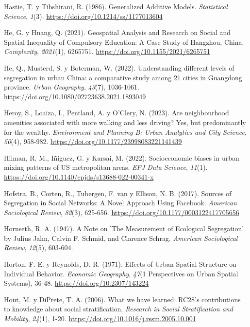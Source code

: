 \documentclass[
  spanish,
  a4paper,%
  chapterprefix=true,%
  DIV=calc,%
  twoside]{scrbook}%
\newlength{\cslhangindent}
\newenvironment{CSLReferences}[2] %
 {\begin{list}{}{%
  \setlength{\itemindent}{0pt}
  \setlength{\leftmargin}{0pt}
  \setlength{\parsep}{0pt}
  \ifodd #1
   \setlength{\leftmargin}{\cslhangindent}
   \setlength{\itemindent}{-1\cslhangindent}
  \fi
  \setlength{\itemsep}{#2\baselineskip}}}
 {\end{list}}
\begin{document}
\begin{CSLReferences}{1}{0}
Hastie, T. y Tibshirani, R. (1986). Generalized Additive Models. \emph{Statistical Science}, \emph{1}(3). \url{https://doi.org/10.1214/ss/1177013604}

He, G. y Huang, Q. (2021). Geospatial Analysis and Research on Social and Spatial Inequality of Compulsory Education: A Case Study of Hangzhou, China. \emph{Complexity}, \emph{2021}(1), 6265751. \url{https://doi.org/10.1155/2021/6265751}

He, Q., Musterd, S. y Boterman, W. (2022). Understanding different levels of segregation in urban China: a comparative study among 21 cities in Guangdong province. \emph{Urban Geography}, \emph{43}(7), 1036-1061. \url{https://doi.org/10.1080/02723638.2021.1893049}

Heroy, S., Loaiza, I., Pentland, A. y O'Clery, N. (2023). Are neighbourhood amenities associated with more walking and less driving? Yes, but predominantly for the wealthy. \emph{Environment and Planning B: Urban Analytics and City Science}, \emph{50}(4), 958-982. \url{https://doi.org/10.1177/23998083221141439}

Hilman, R. M., Iñiguez, G. y Karsai, M. (2022). Socioeconomic biases in urban mixing patterns of US metropolitan areas. \emph{EPJ Data Science}, \emph{11}(1). \url{https://doi.org/10.1140/epjds/s13688-022-00341-x}

Hofstra, B., Corten, R., Tubergen, F. van y Ellison, N. B. (2017). Sources of Segregation in Social Networks: A Novel Approach Using Facebook. \emph{American Sociological Review}, \emph{82}(3), 625-656. \url{https://doi.org/10.1177/0003122417705656}

Hornseth, R. A. (1947). A Note on 'The Measurement of Ecological Segregation' by Julius Jahn, Calvin F. Schmid, and Clarence Schrag. \emph{American Sociological Review}, \emph{12}(5), 603-604.

Horton, F. E. y Reynolds, D. R. (1971). Effects of Urban Spatial Structure on Individual Behavior. \emph{Economic Geography}, \emph{47}(1 Perspectives on Urban Spatial Systems), 36-48. \url{https://doi.org/10.2307/143224}

Hout, M. y DiPrete, T. A. (2006). What we have learned: RC28's contributions to knowledge about social stratification. \emph{Research in Social Stratification and Mobility}, \emph{24}(1), 1-20. \url{https://doi.org/10.1016/j.rssm.2005.10.001}


\end{CSLReferences}
\end{document}
